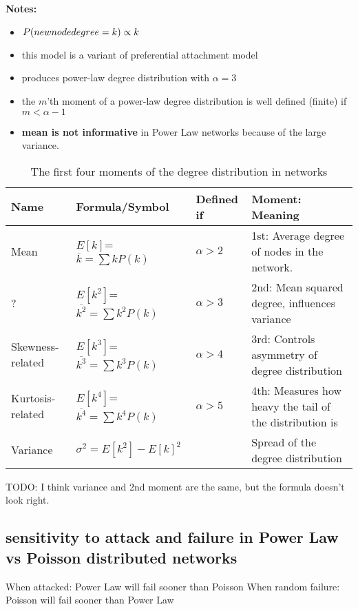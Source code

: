 \documentclass[crop=false]{standalone}
\begin{document}
\textbf{Notes:}
\begin{itemize}
    \item $P (new \space node\space degree = k) \propto k$ 
    \item this model is a variant of preferential attachment model
    \item produces power-law degree distribution with $\alpha=3$
    \item the $m$’th moment of a power-law degree distribution is well defined (finite) if $m < \alpha-1 $
    \item  \textbf{mean is not informative} in Power Law networks because of the large variance.

\end{itemize}
\begin{table}[h]
    \centering
    \begin{tabular}{|l|l|l|l|}
        \hline
         \textbf{Name}& \textbf{Formula/Symbol}&  Defined if&\textbf{Moment: Meaning}\\
        \hline
         Mean& 
        \( {E}[k] \)=\( \overline{k} = \sum k P(k) \)& 
         $\alpha>2$
&1st: Average degree of nodes in the network.\\
        \hline
         ?& 
        \( {E}[k^2] \)=\( \overline{k^2} = \sum k^2 P(k) \)& 
         $\alpha>3$
&2nd: Mean squared degree, influences variance\\
        \hline
         Skewness-related& 
        \( {E}[k^3] \)=\( \overline{k^3} = \sum k^3 P(k) \)& 
         $\alpha>4$
&3rd: Controls asymmetry of degree distribution\\
        \hline
         Kurtosis-related& 
        \( {E}[k^4] \)=\( \overline{k^4} = \sum k^4 P(k) \)& 
         $\alpha>5$
&4th: Measures how heavy the tail of the distribution is\\
        \hline
  Variance& \( \sigma^2 = {E}[k^2] - {E}[k]^2 \) & &Spread of the degree distribution  \\\hline
    \end{tabular}
    \caption{The first four moments of the degree distribution in networks}
    \label{tab:moments}
\end{table}
 TODO: I think variance and 2nd moment are the same, but the formula doesn't look right.

\subsection{sensitivity to attack and failure in Power Law vs Poisson distributed networks}
When attacked: Power Law will fail sooner than Poisson
When random failure: Poisson will fail sooner than Power Law
\end{document}
